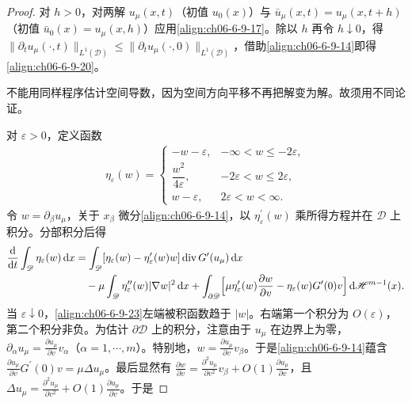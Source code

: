 \documentclass[../../main.tex]{subfiles}
\begin{document}
\begin{proof}
对 $h>0$，对两解 $u_{\mu}(x,t)$（初值 $u_{0}(x)$）与 $\bar{u}_{\mu}(x,t)=u_{\mu}(x,t+h)$（初值 $\bar{u}_{0}(x)=u_{\mu}(x,h)$）应用\eqref{align:ch06-6-9-17}。除以 $h$ 再令 $h\downarrow 0$，得 $\|\partial_{t}u_{\mu}(\cdot,t)\|_{L^{1}(\mathscr{D})}\leqslant\|\partial_{t}u_{\mu}(\cdot,0)\|_{L^{1}(\mathscr{D})}$，借助\eqref{align:ch06-6-9-14}即得\eqref{align:ch06-6-9-20}。

不能用同样程序估计空间导数，因为空间方向平移不再把解变为解。故须用不同论证。

对 $\varepsilon>0$，定义函数
\begin{align}
\eta_{\varepsilon}(w)=
\begin{cases}
-w-\varepsilon, & -\infty<w\leqslant-2\varepsilon,\\
\dfrac{w^{2}}{4\varepsilon}, & -2\varepsilon<w\leqslant 2\varepsilon,\\[6pt]
w-\varepsilon, & 2\varepsilon<w<\infty.
\end{cases}
\label{align:ch06-6-9-22}
\end{align}
令 $w=\partial_{\beta}u_{\mu}$，关于 $x_{\beta}$ 微分\eqref{align:ch06-6-9-14}，以 $\eta_{\varepsilon}^{\prime}(w)$ 乘所得方程并在 $\mathscr{D}$ 上积分。分部积分后得
\begin{align}
\frac{\mathrm{d}}{\mathrm{d}t}\int_{\mathscr{D}}\eta_{\varepsilon}(w)\,\mathrm{d}x
&=\int_{\mathscr{D}}[\eta_{\varepsilon}(w)-\eta_{\varepsilon}^{\prime}(w)w]\operatorname{div}G^{\prime}(u_{\mu})\,\mathrm{d}x\notag\\
&\quad-\mu\int_{\mathscr{D}}\eta_{\varepsilon}^{\prime\prime}(w)|\nabla w|^{2}\,\mathrm{d}x+\int_{\partial\mathscr{D}}\Bigl{[}\mu\eta_{\varepsilon}^{\prime}(w)\frac{\partial w}{\partial v}-\eta_{\varepsilon}(w)G^{\prime}(0)v\Bigr{]}\,\mathrm{d}\mathscr{H}^{m-1}(x).
\label{align:ch06-6-9-23}
\end{align}
当 $\varepsilon\downarrow 0$，\eqref{align:ch06-6-9-23}左端被积函数趋于 $|w|$。右端第一个积分为 $O(\varepsilon)$，第二个积分非负。为估计 $\partial\mathscr{D}$ 上的积分，注意由于 $u_{\mu}$ 在边界上为零，$\partial_{\alpha}u_{\mu}=\frac{\partial u_{\mu}}{\partial v}v_{\alpha}$（$\alpha=1,\cdots,m$）。特别地，$w=\frac{\partial u_{\mu}}{\partial v}v_{\beta}$。于是\eqref{align:ch06-6-9-14}蕴含 $\frac{\partial u_{\mu}}{\partial v}G^{\prime}(0)v=\mu\Delta u_{\mu}$。最后显然有 $\frac{\partial w}{\partial v}=\frac{\partial^{2}u_{\mu}}{\partial v^{2}}v_{\beta}+O(1)\frac{\partial u_{\mu}}{\partial v}$，且 $\Delta u_{\mu}=\frac{\partial^{2}u_{\mu}}{\partial v^{2}}+O(1)\frac{\partial u_{\mu}}{\partial v}$。于是

\end{proof}
\end{document}
